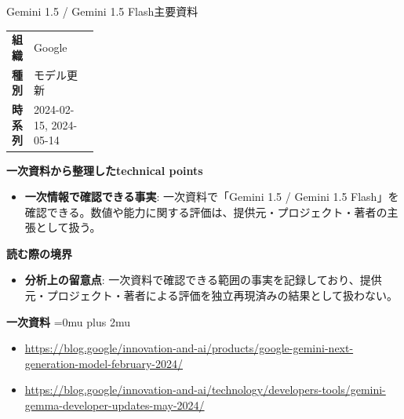 \begin{technicalnote}{Gemini 1.5 / Gemini 1.5 Flash}{主要資料}
\begingroup
\begin{tabularx}{\linewidth}{@{}>{\bfseries}p{0.22\linewidth}X@{}}
組織 & Google \\
種別 & モデル更新 \\
時系列 & 2024-02-15, 2024-05-14 \\
\end{tabularx}
\smallskip
{\bfseries 一次資料から整理したtechnical points}
\begin{itemize}[leftmargin=1.5em,itemsep=0.35em]
\item \textbf{一次情報で確認できる事実}: 一次資料で「Gemini 1.5 / Gemini 1.5 Flash」を確認できる。数値や能力に関する評価は、提供元・プロジェクト・著者の主張として扱う。
\end{itemize}
\begin{minipage}{\linewidth}
{\bfseries 読む際の境界}
\begin{itemize}[leftmargin=1.5em,itemsep=0.35em]
\item \textbf{分析上の留意点}: 一次資料で確認できる範囲の事実を記録しており、提供元・プロジェクト・著者による評価を独立再現済みの結果として扱わない。
\end{itemize}
\begin{samepage}
{\bfseries 一次資料}
\begingroup\sloppy
\Urlmuskip=0mu plus 2mu\relax
\begin{itemize}[leftmargin=1.5em,itemsep=0.25em]
\item {\scriptsize\url{https://blog.google/innovation-and-ai/products/google-gemini-next-generation-model-february-2024/}}
\item {\scriptsize\url{https://blog.google/innovation-and-ai/technology/developers-tools/gemini-gemma-developer-updates-may-2024/}}
\end{itemize}
\endgroup
\end{samepage}
\end{minipage}
\endgroup
\end{technicalnote}
\medskip

